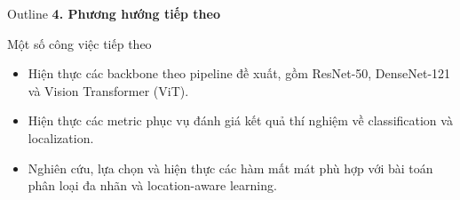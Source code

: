 \documentclass[10pt]{beamer}
\begin{document}
\begin{frame}{Outline}
    \centering
    \Large \textbf{4. Phương hướng tiếp theo}
\end{frame}

\begin{frame}{Một số công việc tiếp theo}
    \begin{itemize}
        \item Hiện thực các backbone theo pipeline đề xuất, gồm ResNet-50, DenseNet-121 và Vision Transformer (ViT).
        \item Hiện thực các metric phục vụ đánh giá kết quả thí nghiệm về classification và localization.
        \item Nghiên cứu, lựa chọn và hiện thực các hàm mất mát phù hợp với bài toán phân loại đa nhãn và location-aware learning.
    \end{itemize}
\end{frame}
\end{document}
